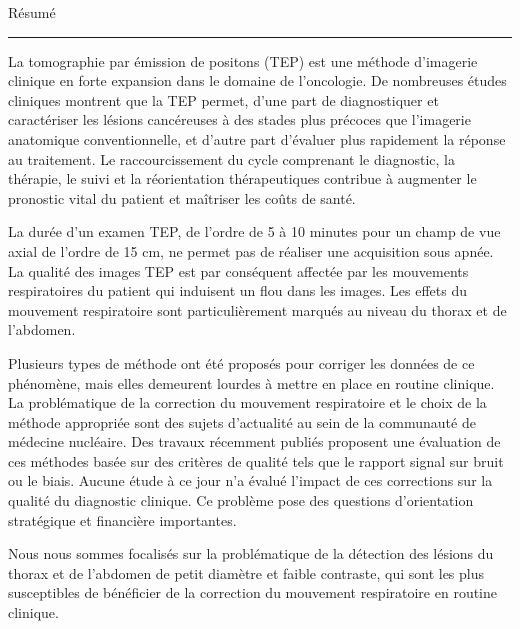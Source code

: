 {\fontsize{30}{100}\selectfont Résumé}

\rule{15cm}{0.1em}

\vspace{1cm}

\thispagestyle{plain}

La tomographie par émission de positons (TEP) est une méthode d’imagerie clinique en forte expansion dans le domaine de l’oncologie. De nombreuses études cliniques montrent que la TEP permet, d’une part de diagnostiquer et caractériser les lésions cancéreuses à des stades plus précoces que l’imagerie anatomique conventionnelle, et d’autre part d’évaluer plus rapidement la réponse au traitement. Le raccourcissement du cycle comprenant le diagnostic, la thérapie, le suivi et la réorientation thérapeutiques contribue à augmenter le pronostic vital du patient et maîtriser les coûts de santé.

La durée d’un examen TEP, de l’ordre de 5 à 10 minutes pour un champ de vue axial de l’ordre de 15 cm, ne permet pas de réaliser une acquisition sous apnée. La qualité des images TEP est par conséquent affectée par les mouvements respiratoires du patient qui induisent un flou dans les images. Les effets du mouvement respiratoire sont particulièrement marqués au niveau du thorax et de l’abdomen.

Plusieurs types de méthode ont été proposés pour corriger les données de ce phénomène, mais elles demeurent lourdes à mettre en place en routine clinique. La problématique de la correction du mouvement respiratoire et le choix de la méthode appropriée sont des sujets d’actualité au sein de la communauté de médecine nucléaire. Des travaux récemment publiés proposent une évaluation de ces méthodes basée sur des critères de qualité tels que le rapport signal sur bruit ou le biais. Aucune étude à ce jour n’a évalué l’impact de ces corrections sur la qualité du diagnostic clinique. Ce problème pose des questions d’orientation stratégique et financière importantes.

Nous nous sommes focalisés sur la problématique de la détection des lésions du thorax et de l'abdomen de petit diamètre et faible contraste, qui sont les plus susceptibles de  bénéficier de la correction du mouvement respiratoire en routine clinique.

